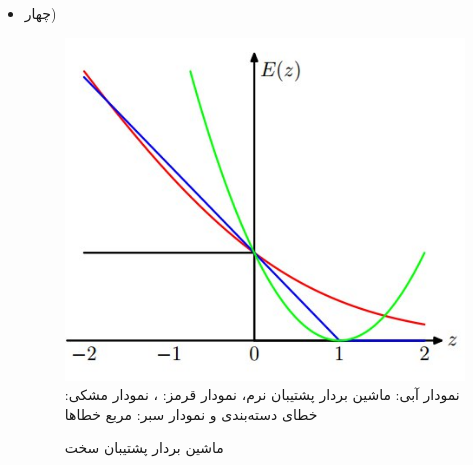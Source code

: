 \begin{itemize}
\begin{itemize}
		استفاده روش دوگان به ما امکان استفاده از هسته‌ها را می‌دهد و می‌توانیم دسته‌بند حاشیه بیشینه 
		\footnote{}
		را که ابعاد  ویژگی‌های آن بیش‌تر از تعداد نقاط است پیدا کنیم و بسیار کارا است و حتی جواب‌گوی مواقعی که تعداد ویژگی‌ها به بی‌نهایت میل می‌کند می‌باشد.
		\footnote{ر.ک صفجه ۳۲۹ کتاب}
		\item چهار)
		\begin{figure}[hbpt!]
			\centering
			\includegraphics[scale=0.5]{./img/2.jpeg}
			\caption{نمودار آبی: ماشین بردار پشتیبان نرم، نمودار قرمز: 
			،
			نمودار مشکی: خطای دسته‌بندی
			و نمودار سبر: مربع خطاها
			}
		\end{figure}
		\begin{figure}[hbpt!]
			\centering
			\caption{ماشین بردار پشتیبان سخت}
		\end{figure}
	

\end{itemize}
\end{itemize}
